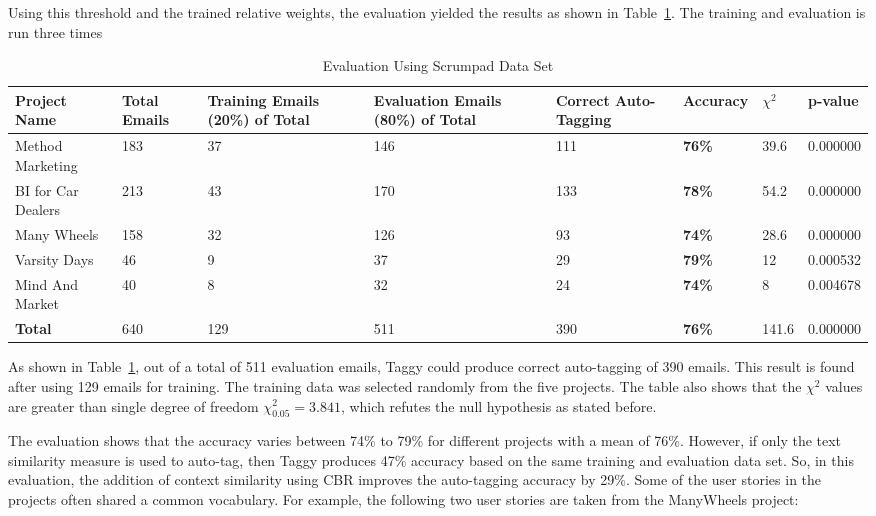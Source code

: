 Using this threshold and the trained relative weights, the evaluation yielded the results as shown in Table~\ref{tab:sp_evaluation}. The training and evaluation is run three times 

\begin{table}[h!]
  \centering
  \caption{Evaluation Using Scrumpad Data Set}
	\label{tab:sp_evaluation}
    \begin{tabular}{|p{1.7cm}|p{1.4cm}|p{2cm}|p{2cm}|p{1.7cm}|p{1.7cm}|p{1cm}|p{1.5cm}|}
      \hline
      \textbf{Project Name} & \textbf{Total Emails} & \textbf{Training Emails (20\%) of Total} & \textbf{Evaluation Emails (80\%)  of Total} & \textbf{Correct Auto-Tagging} & \textbf{Accuracy} & $\chi^{2}$ & p-value\\
      \hline
      Method Marketing & 183 		& 37	& 146	&	111 & \textbf{76\%}	& 39.6	& 0.000000\\
      \hline
      BI for Car Dealers & 213 	& 43	& 170	&	133	& \textbf{78\%}	& 54.2	& 0.000000\\
      \hline
      Many Wheels & 158 				& 32	& 126	& 93	& \textbf{74\%}	& 28.6 	& 0.000000\\
      \hline
      Varsity Days & 46 				& 9		&	37	& 29	& \textbf{79\%}	& 12		& 0.000532\\
      \hline
      Mind And Market & 40 			& 8		& 32	&	24	& \textbf{74\%}	& 8			& 0.004678\\
      \hline
      \textbf{Total} & 640 			& 129	& 511	&	390	& \textbf{76\%}	& 141.6 & 0.000000\\
      \hline
    \end{tabular}
\end{table}

As shown in Table~\ref{tab:sp_evaluation}, out of a total of 511 evaluation emails, Taggy could produce correct auto-tagging of 390 emails. This result is found after using 129 emails for training. The training data was selected randomly from the five projects. The table also shows that the $\chi^{2}$ values are greater than single degree of freedom $\chi^{2}_{0.05} = 3.841$, which refutes the null hypothesis as stated before.

The evaluation shows that the accuracy varies between 74\% to 79\% for different projects with a mean of 76\%. However, if only the text similarity measure is used to auto-tag, then Taggy produces 47\% accuracy based on the same training and evaluation data set. So, in this evaluation, the addition of context similarity using CBR improves the auto-tagging accuracy by 29\%. Some of the user stories in the projects often shared a common vocabulary. For example, the following two user stories are taken from the ManyWheels project:

